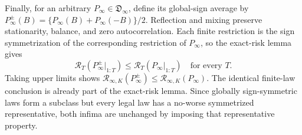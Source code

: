 Finally, for an arbitrary \(P_{\infty}\in\mathfrak D_{\infty}\), define its global-sign average by \(P_{\infty}^{\pm}(B)=\{P_{\infty}(B)+P_{\infty}(-B)\}/2\).  Reflection and mixing preserve stationarity, balance, and zero autocorrelation.  Each finite restriction is the sign symmetrization of the corresponding restriction of \(P_{\infty}\), so the exact-risk lemma gives
\[
\mathcal R_T(P_{\infty}^{\pm}|_{1:T})
\le\mathcal R_T(P_{\infty}|_{1:T})
\quad\text{for every }T.
\]
Taking upper limits shows \(\mathcal R_{\infty,K}(P_{\infty}^{\pm})\le\mathcal R_{\infty,K}(P_{\infty})\).  The identical finite-law conclusion is already part of the exact-risk lemma.  Since globally sign-symmetric laws form a subclass but every legal law has a no-worse symmetrized representative, both infima are unchanged by imposing that representative property.
